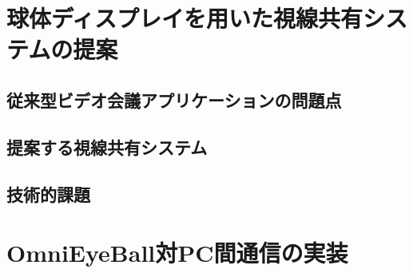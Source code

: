\documentclass[a4j,11pt,oneside,openany,report]{jsbook}
\begin{document}
\chapter{球体ディスプレイを用いた視線共有システムの提案}
\section{従来型ビデオ会議アプリケーションの問題点}
\section{提案する視線共有システム}
\section{技術的課題}

\chapter{OmniEyeBall対PC間通信の実装}
\end{document}
